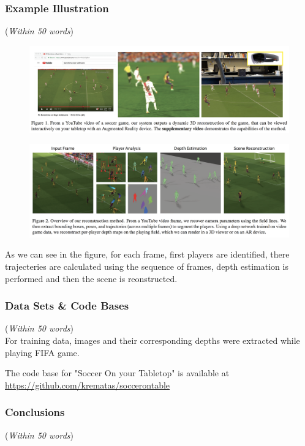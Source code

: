 \documentclass[11pt]{article}
\begin{document}
\subsubsection{Example Illustration}
({\em Within 50 words}) \\

\begin{figure}
	\centering
	\includegraphics[width=\textwidth]{WPL/SOYTT1.png}
\end{figure}
\begin{figure}
	\centering
	\includegraphics[width=\textwidth]{WPL/SOYTT2.png}
\end{figure}

As we can see in the figure, for each frame, first players are identified, there trajecteries are calculated using the sequence of frames, depth estimation is performed and then the scene is reonstructed.

\subsubsection{Data Sets \& Code Bases}
({\em Within 50 words}) \\

For training data, images and their corresponding depths were extracted while playing FIFA game.

The code base for "Soccer On your Tabletop" is available at 
\url{https://github.com/krematas/soccerontable}

\subsubsection{Conclusions}
({\em Within 50 words}) \\
\end{document}
